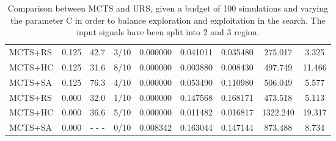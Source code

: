 \documentclass[11pt]{article}
\begin{document}
\begin{table}[ht]
\begin{tabular}{|l|l|c|c|c|c|c|c|c|}
MCTS+RS                                     & 0.125              &  42.7                   & 3/10                          & 0.000000 & 0.041011 & 0.035480  &  275.017   &  3.325       \\
MCTS+HC                                     & 0.125              &  31.6                   & 8/10                          & 0.000000 & 0.003880 & 0.008430  &  497.749   & 11.466       \\
MCTS+SA                                     & 0.125              &  76.3                   & 4/10                          & 0.000000 & 0.053490 & 0.110980  &  506.049   &  5.577       \\ \hline
MCTS+RS                                     & 0.000              &  32.0                   & 1/10                          & 0.000000 & 0.147568 & 0.168171  &  473.518   &  5.113       \\
MCTS+HC                                     & 0.000              &  36.6                   & 5/10                          & 0.000000 & 0.011482 & 0.016817  & 1322.240   & 19.317       \\
MCTS+SA                                     & 0.000              & - - -                   & 0/10                          & 0.008342 & 0.163044 & 0.147144  &  873.488   &  8.734       \\ \hline
\end{tabular}
\caption{Comparison between MCTS and URS, given a budget of 100 simulations and varying the parameter C in order to balance exploration and exploitation in the search. The input signals have been split into 2 and 3 region.}
\end{table}
\end{document}
